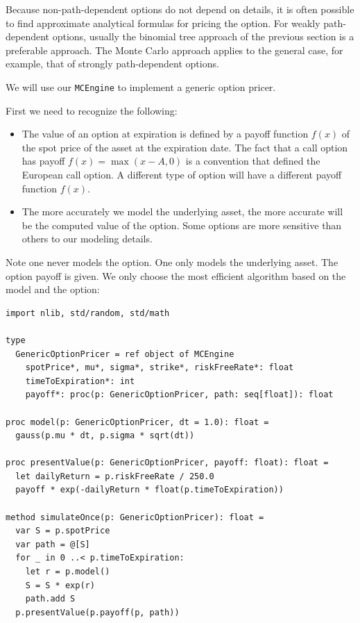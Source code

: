 \documentclass[justified, sixbynine]{tufte-book}
\def\ft{\small\tt}
\theoremstyle{plain}%
\newtheorem * {corollary}{Corollary}
\theoremstyle{definition}
\theoremstyle{remark}
\newtheorem * {remark}{Remark}
\newtheorem * {note}{Note}
\begin{document}
\begin{fullwidth}
 Because non-path-dependent options do not depend on details, it is often possible to find approximate analytical formulas for pricing the option. For weakly path-dependent options, usually the binomial tree approach of the previous section is a preferable approach. The Monte Carlo approach applies to the general case, for example, that of strongly path-dependent options.

We will use our {\ft MCEngine} to implement a generic option pricer.

First we need to recognize the following:

\begin{itemize}
\item  The value of an option at expiration is defined by a payoff function
$f(x)$ of the spot price of the asset at the expiration date. The fact that
a call option has payoff $f(x)=\max (x-A, 0)$ is a convention that defined the European call option.
A different type of option will have a different payoff function $f(x)$.

\item  The more accurately we model the underlying asset, the more accurate will be the computed value of the option. Some options are more sensitive than others to our modeling details.
\end{itemize}

Note one never models the option. One only models the underlying asset. The option payoff is given. We only choose the most efficient algorithm based on the model and the option:

\begin{lstlisting}[caption={in file: {\ft options.nim}}]
import nlib, std/random, std/math

type
  GenericOptionPricer = ref object of MCEngine
    spotPrice*, mu*, sigma*, strike*, riskFreeRate*: float
    timeToExpiration*: int
    payoff*: proc(p: GenericOptionPricer, path: seq[float]): float

proc model(p: GenericOptionPricer, dt = 1.0): float =
  gauss(p.mu * dt, p.sigma * sqrt(dt))

proc presentValue(p: GenericOptionPricer, payoff: float): float =
  let dailyReturn = p.riskFreeRate / 250.0
  payoff * exp(-dailyReturn * float(p.timeToExpiration))

method simulateOnce(p: GenericOptionPricer): float =
  var S = p.spotPrice
  var path = @[S]
  for _ in 0 ..< p.timeToExpiration:
    let r = p.model()
    S = S * exp(r)
    path.add S
  p.presentValue(p.payoff(p, path))


\end{lstlisting}
\end{fullwidth}
\end{document}
